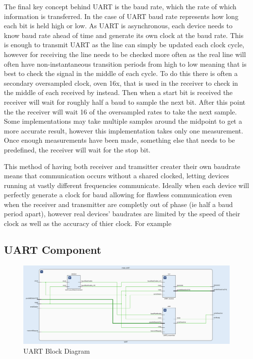 \documentclass[11pt]{article}
\begin{document}
The final key concept behind UART is the baud rate, which the rate of which information is transferred.
In the case of UART baud rate represents how long each bit is held high or low.
As UART is asynchronous, each device needs to know baud rate ahead of time and generate its own clock at the baud rate.
This is enough to transmit UART as the line can simply be updated each clock cycle,
however for receiving the line needs to be checked more often as the real line will often have non-instantaneous transition periods from high to low meaning that is best to check the signal in the middle of each cycle.
To do this there is often a secondary oversampled clock, oven 16x, that is used in the receiver to check in the middle of each received by instead.
Then when a start bit is received the receiver will wait for roughly half a baud to sample the next bit.
After this point the the receiver will wait 16 of the oversampled rates to take the next sample.
Some implementations may take multiple samples around the midpoint to get a more accurate result, however this implementation takes only one measurement.
Once enough measurements have been made, something else that needs to be predefined, the receiver will wait for the stop bit.

This method of having both receiver and tramsitter creater their own baudrate means that communication occurs without a shared clocked, letting devices running at vastly different frequencies communicate.
Ideally when each device will perfectly generate a clock for baud allowing for flawless communication even when the receiver and transmitter are completly out of phase (ie half a baud period apart), however real devices' baudrates are limited by the speed of their clock as well as the accuracy of thier clock.
For example  

\subsection{UART Component}
\begin{figure}[H]        
    \centering
    \includegraphics[width=\textwidth]{uartImp.png}
    \caption{UART Block Diagram}
    \label{fig:UARTimp}
\end{figure} 
\end{document}

